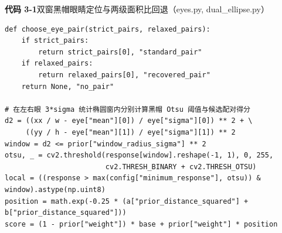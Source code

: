 \noindent\textbf{代码 3-1}\quad 双窗黑帽眼睛定位与两级面积比回退（eyes.py, dual\_ellipse.py）
\begin{lstlisting}
def choose_eye_pair(strict_pairs, relaxed_pairs):
    if strict_pairs:
        return strict_pairs[0], "standard_pair"
    if relaxed_pairs:
        return relaxed_pairs[0], "recovered_pair"
    return None, "no_pair"

# 在左右眼 3*sigma 统计椭圆窗内分别计算黑帽 Otsu 阈值与候选配对得分
d2 = ((xx / w - eye["mean"][0]) / eye["sigma"][0]) ** 2 + \
     ((yy / h - eye["mean"][1]) / eye["sigma"][1]) ** 2
window = d2 <= prior["window_radius_sigma"] ** 2
otsu, _ = cv2.threshold(response[window].reshape(-1, 1), 0, 255,
                        cv2.THRESH_BINARY + cv2.THRESH_OTSU)
local = ((response > max(config["minimum_response"], otsu)) & window).astype(np.uint8)
position = math.exp(-0.25 * (a["prior_distance_squared"] + b["prior_distance_squared"]))
score = (1 - prior["weight"]) * base + prior["weight"] * position
\end{lstlisting}
